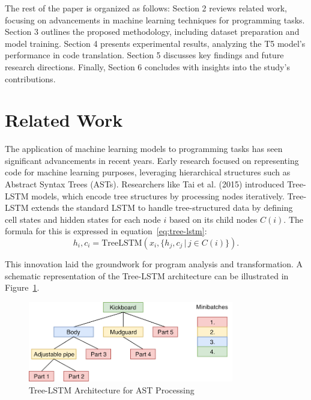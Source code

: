 \documentclass{dhbenelux}
\begin{document}
The rest of the paper is organized as follows: Section 2 reviews related work, focusing on advancements in machine learning techniques for programming tasks. Section 3 outlines the proposed methodology, including dataset preparation and model training. Section 4 presents experimental results, analyzing the T5 model's performance in code translation. Section 5 discusses key findings and future research directions. Finally, Section 6 concludes with insights into the study's contributions.

\section{Related Work}

The application of machine learning models to programming tasks has seen significant advancements in recent years. Early research focused on representing code for machine learning purposes, leveraging hierarchical structures such as Abstract Syntax Trees (ASTs). Researchers like Tai et al. (2015) introduced Tree-LSTM models, which encode tree structures by processing nodes iteratively. Tree-LSTM extends the standard LSTM to handle tree-structured data by defining cell states and hidden states for each node \( i \) based on its child nodes \( C(i) \). The formula for this is expressed in equation~\ref{eq:tree-lstm}:
\begin{equation}
h_i, c_i = \text{TreeLSTM}(x_i, \{h_{j}, c_{j} \,|\, j \in C(i)\}).
\label{eq:tree-lstm}
\end{equation}

This innovation laid the groundwork for program analysis and transformation. A schematic representation of the Tree-LSTM architecture can be illustrated in Figure~\ref{fig:tree-lstm}.

\begin{figure}[h]
    \centering
    \includegraphics[width=0.8\textwidth]{Images/1.png} %
    \caption{Tree-LSTM Architecture for AST Processing}
    \label{fig:tree-lstm}
\end{figure}
\end{document}
